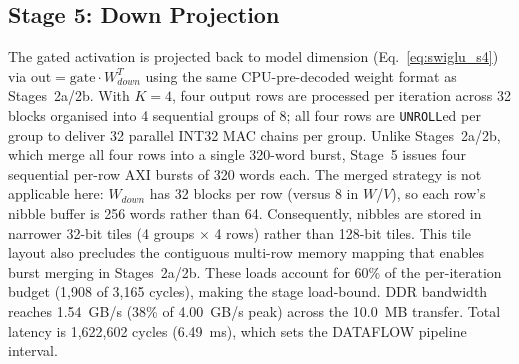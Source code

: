 \documentclass[manuscript,]{acmart} %
\begin{document}

\subsection*{Stage 5: Down Projection}

The gated activation is projected back to model dimension (Eq.~\eqref{eq:swiglu_s4}) via
$\text{out} = \text{gate} \cdot W_{down}^{T}$ using the same CPU-pre-decoded weight
format as Stages~2a/2b.
With $K=4$, four output rows are processed per iteration across 32 blocks
organised into 4 sequential groups of 8; all four rows are \texttt{UNROLL}ed per group
to deliver 32 parallel INT32 MAC chains per group.
Unlike Stages~2a/2b, which merge all four rows into a single 320-word burst,
Stage~5 issues four sequential per-row AXI bursts of 320 words each.
The merged strategy is not applicable here: $W_{down}$ has 32 blocks per row
(versus 8 in $W$/$V$), so each row's nibble buffer is 256 words rather than 64.
Consequently, nibbles are stored in narrower 32-bit tiles (4 groups $\times$ 4 rows)
rather than 128-bit tiles. This tile layout also precludes the contiguous multi-row memory mapping
that enables burst merging in Stages~2a/2b.
These loads account for 60\% of the per-iteration budget (1,908 of 3,165 cycles),
making the stage load-bound.
DDR bandwidth reaches \SI{1.54}{GB/s} (38\% of \SI{4.00}{GB/s} peak) across
the \SI{10.0}{MB} transfer.
Total latency is 1,622,602 cycles (\SI{6.49}{ms}), which sets the DATAFLOW
pipeline interval.
\end{document}
